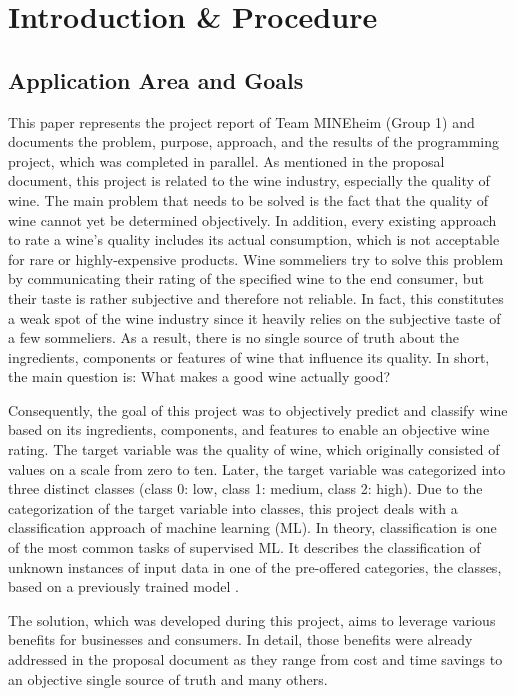 \chapter{Introduction \& Procedure}
\section{Application Area and Goals}


This paper represents the project report of Team MINEheim (Group 1) and documents the problem, purpose, approach, and the results of the programming project, which was completed in parallel. As mentioned in the proposal document, this project is related to the wine industry, especially the quality of wine. The main problem that needs to be solved is the fact that the quality of wine cannot yet be determined objectively. In addition, every existing approach to rate a wine's quality includes its actual consumption, which is not acceptable for rare or highly-expensive products. Wine sommeliers try to solve this problem by communicating their rating of the specified wine to the end consumer, but their taste is rather subjective and therefore not reliable. In fact, this constitutes a weak spot of the wine industry since it heavily relies on the subjective taste of a few sommeliers. As a result, there is no single source of truth about the ingredients, components or features of wine that influence its quality. In short, the main question is: What makes a good wine actually good?

Consequently, the goal of this project was to objectively predict and classify wine based on its ingredients, components, and features to enable an objective wine rating. The target variable was the quality of wine, which originally consisted of values on a scale from zero to ten. Later, the target variable was categorized into three distinct classes (class 0: low, class 1: medium, class 2: high). Due to the categorization of the target variable into classes, this project deals with a classification approach of machine learning (ML). In theory, classification is one of the most common tasks of supervised ML. It describes the classification of unknown instances of input data in one of the pre-offered categories, the classes, based on a previously trained model \citep{Novakovic2010}.

The solution, which was developed during this project, aims to leverage various benefits for businesses and consumers. In detail, those benefits were already addressed in the proposal document as they range from cost and time savings to an objective single source of truth and many others. 